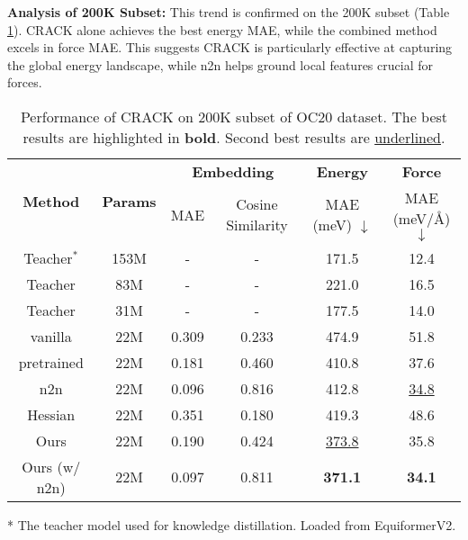 \documentclass{article}
\begin{document}
\textbf{Analysis of 200K Subset:} This trend is confirmed on the 200K subset (Table \ref{tab:crack-oc20-200k}). CRACK alone achieves the best energy MAE, while the combined method excels in force MAE. 
This suggests CRACK is particularly effective at capturing the global energy landscape, while n2n helps ground local features crucial for forces.

\begin{table}[htbp]
\centering
\caption{Performance of CRACK on 200K subset of OC20 dataset. The best results are highlighted in \textbf{bold}. Second best results are \underline{underlined}.}
\label{tab:crack-oc20-200k}
\begin{adjustbox}{max width=0.8\textwidth}
\begin{threeparttable}
\begin{tabular}{cccccc}
\toprule
\multirow{2}{*}{\textbf{Method}} & \multirow{2}{*}{\textbf{Params}} & \multicolumn{2}{c}{\textbf{Embedding}} & \textbf{Energy} & \textbf{Force} \\
\cmidrule(lr){3-6}
 & & MAE & Cosine Similarity & MAE (meV) $\downarrow$ & MAE (meV/Å) $\downarrow$ \\
\midrule
Teacher$^*$ & 153M & - & - & 171.5 & 12.4 \\
Teacher & 83M & - & - & 221.0 & 16.5 \\
Teacher & 31M & - & - & 177.5 & 14.0 \\
\midrule
vanilla & 22M & 0.309 & 0.233 & 474.9 & 51.8 \\ 
pretrained & 22M & 0.181 & 0.460 & 410.8 & 37.6 \\ 
n2n & 22M & 0.096 & 0.816 & 412.8 & \underline{34.8} \\ 
Hessian & 22M & 0.351 & 0.180 & 419.3 & 48.6 \\ 
\midrule
Ours & 22M & 0.190 & 0.424 & \underline{373.8} & 35.8 \\ 
Ours (w/ n2n) & 22M & 0.097 & 0.811 & \textbf{371.1} & \textbf{34.1} \\ 
\bottomrule 
\end{tabular}
\begin{tablenotes}
\small
\item[*] The teacher model used for knowledge distillation. Loaded from EquiformerV2.
\end{tablenotes}
\end{threeparttable}
\end{adjustbox}
\end{table}
\end{document}
